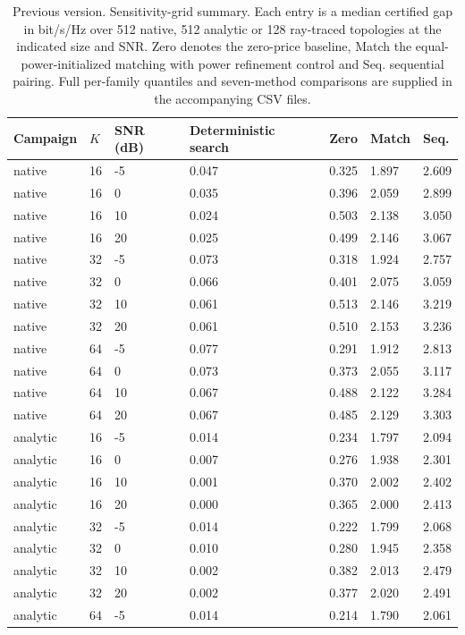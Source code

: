 \documentclass[10pt,letterpaper]{article}
\begin{document}
\begin{table}[p]\color{red}\centering\small
\setlength{\tabcolsep}{3pt}
\caption*{Previous version. Sensitivity-grid summary. Each entry is a median certified gap in bit/s/Hz over 512 native, 512 analytic or 128 ray-traced topologies at the indicated size and SNR. Zero denotes the zero-price baseline, Match the equal-power-initialized matching with power refinement control and Seq. sequential pairing. Full per-family quantiles and seven-method comparisons are supplied in the accompanying CSV files.}
\begin{tabular}{lllllll}\toprule
Campaign & $K$ & SNR (dB) & Deterministic search & Zero & Match & Seq.\\\midrule
native & 16 & -5 & 0.047 & 0.325 & 1.897 & 2.609\\
native & 16 & 0 & 0.035 & 0.396 & 2.059 & 2.899\\
native & 16 & 10 & 0.024 & 0.503 & 2.138 & 3.050\\
native & 16 & 20 & 0.025 & 0.499 & 2.146 & 3.067\\
native & 32 & -5 & 0.073 & 0.318 & 1.924 & 2.757\\
native & 32 & 0 & 0.066 & 0.401 & 2.075 & 3.059\\
native & 32 & 10 & 0.061 & 0.513 & 2.146 & 3.219\\
native & 32 & 20 & 0.061 & 0.510 & 2.153 & 3.236\\
native & 64 & -5 & 0.077 & 0.291 & 1.912 & 2.813\\
native & 64 & 0 & 0.073 & 0.373 & 2.055 & 3.117\\
native & 64 & 10 & 0.067 & 0.488 & 2.122 & 3.284\\
native & 64 & 20 & 0.067 & 0.485 & 2.129 & 3.303\\
analytic & 16 & -5 & 0.014 & 0.234 & 1.797 & 2.094\\
analytic & 16 & 0 & 0.007 & 0.276 & 1.938 & 2.301\\
analytic & 16 & 10 & 0.001 & 0.370 & 2.002 & 2.402\\
analytic & 16 & 20 & 0.000 & 0.365 & 2.000 & 2.413\\
analytic & 32 & -5 & 0.014 & 0.222 & 1.799 & 2.068\\
analytic & 32 & 0 & 0.010 & 0.280 & 1.945 & 2.358\\
analytic & 32 & 10 & 0.002 & 0.382 & 2.013 & 2.479\\
analytic & 32 & 20 & 0.002 & 0.377 & 2.020 & 2.491\\
analytic & 64 & -5 & 0.014 & 0.214 & 1.790 & 2.061\\

\end{tabular}
\end{table}
\end{document}
